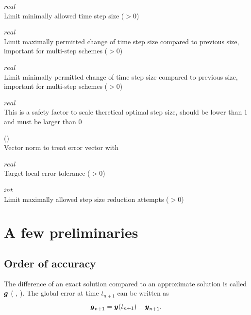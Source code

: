  $real$\\
Limit minimally allowed time step size ($>0$)

 $real$\\
Limit maximally permitted change of time step size compared to previous size, important for multi-step schemes ($>0$)

 $real$\\
Limit minimally permitted change of time step size compared to previous size, important for multi-step schemes ($>0$)

 $real$\\
This is a safety factor to scale theretical optimal step size, should be lower than 1 and must be larger than $0$

 (\kor{}\kor{}\kor{})\\
Vector norm to treat error vector with

 $real$\\
Target local error tolerance ($>0$)

 $int$\\
Limit maximally allowed step size reduction attempts ($>0$)

\section{A few preliminaries}

\subsection{Order of accuracy}\label{strdyn:sec:accuracy}
The difference of an exact solution compared to an approximate solution
is called  $\boldsymbol{g}$ ( \etal{}
\cite{hairer87},  \etal{} \cite{deuflhard94})\@. The global
error at time 
$t_{n+1}$ 
can be written as
\begin{equation}\label{global-error}
  \boldsymbol{g}_{n+1} = \boldsymbol{y}(t_{n+1}) - \boldsymbol{y}_{n+1}
  \text{.}
\end{equation}

